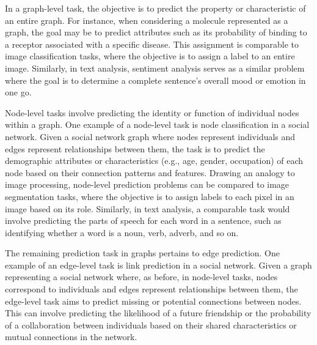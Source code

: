 In a graph-level task, the objective is to predict the property or characteristic of an entire graph.
For instance, when considering a molecule represented as a graph, the goal may be to predict attributes such as its probability of binding to a receptor associated with a specific disease.
This assignment is comparable to image classification tasks, where the objective is to assign a label to an entire image.
Similarly, in text analysis, sentiment analysis serves as a similar problem where the goal is to determine a complete sentence's overall mood or emotion in one go.

Node-level tasks involve predicting the identity or function of individual nodes within a graph.
One example of a node-level task is node classification in a social network.
Given a social network graph where nodes represent individuals and edges represent relationships between them, the task is to predict the demographic attributes or characteristics (e.g., age, gender, occupation) of each node based on their connection patterns and features.
Drawing an analogy to image processing, node-level prediction problems can be compared to image segmentation tasks, where the objective is to assign labels to each pixel in an image based on its role.
Similarly, in text analysis, a comparable task would involve predicting the parts of speech for each word in a sentence, such as identifying whether a word is a noun, verb, adverb, and so on.

The remaining prediction task in graphs pertains to edge prediction.
One example of an edge-level task is link prediction in a social network.
Given a graph representing a social network where, as before, in node-level tasks, nodes correspond to individuals and edges represent relationships between them, the edge-level task aims to predict missing or potential connections between nodes.
This can involve predicting the likelihood of a future friendship or the probability of a collaboration between individuals based on their shared characteristics or mutual connections in the network.

